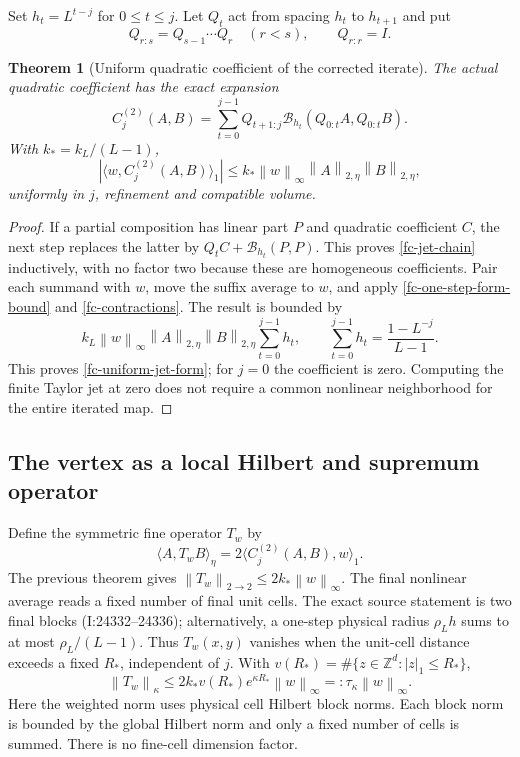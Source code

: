 \documentclass[11pt]{article}
\newtheorem{theorem}{Theorem}
\theoremstyle{remark}\newtheorem{remark}[theorem]{Remark}
\newcommand{\norm}[1]{\left\lVert#1\right\rVert}
\begin{document}
Set $h_t=L^{t-j}$ for $0\le t\le j$. Let $Q_t$ act from spacing
$h_t$ to $h_{t+1}$ and put
\[
 Q_{r:s}=Q_{s-1}\cdots Q_r\quad(r<s),\qquad Q_{r:r}=I.
\]

\begin{theorem}[Uniform quadratic coefficient of the corrected iterate]
\label{fc-iterated-jet-theorem}
The actual quadratic coefficient has the exact expansion
\begin{equation}
 C_j^{(2)}(A,B)=\sum_{t=0}^{j-1}Q_{t+1:j}
       \mathcal B_{h_t}(Q_{0:t}A,Q_{0:t}B).
 \label{fc-jet-chain}
\end{equation}
With $k_*=k_L/(L-1)$,
\begin{equation}
 |\langle w,C_j^{(2)}(A,B)\rangle_1|
 \le k_*\norm{w}_\infty\norm{A}_{2,\eta}\norm{B}_{2,\eta},
 \label{fc-uniform-jet-form}
\end{equation}
uniformly in $j$, refinement and compatible volume.
\end{theorem}

\begin{proof}
If a partial composition has linear part $P$ and quadratic
coefficient $C$, the next step replaces the latter by
$Q_tC+\mathcal B_{h_t}(P,P)$. This proves
\eqref{fc-jet-chain} inductively, with no factor two because these
are homogeneous coefficients. Pair each summand with $w$, move
the suffix average to $w$, and apply
\eqref{fc-one-step-form-bound} and \eqref{fc-contractions}.
The result is bounded by
\[
 k_L\norm{w}_\infty\norm{A}_{2,\eta}\norm{B}_{2,\eta}
       \sum_{t=0}^{j-1}h_t,
 \qquad
 \sum_{t=0}^{j-1}h_t=\frac{1-L^{-j}}{L-1}.
\]
This proves \eqref{fc-uniform-jet-form}; for $j=0$ the coefficient
is zero. Computing the finite Taylor jet at zero does not require
a common nonlinear neighborhood for the entire iterated map.
\end{proof}

\subsection{The vertex as a local Hilbert and supremum operator}
\label{fc-vertex-norm-section}

Define the symmetric fine operator $T_w$ by
\begin{equation}
 \langle A,T_wB\rangle_\eta
       =2\langle C_j^{(2)}(A,B),w\rangle_1.
 \label{fc-T-definition}
\end{equation}
The previous theorem gives
$\norm{T_w}_{2\to2}\le2k_*\norm{w}_\infty$.
The final nonlinear average reads a fixed number of final unit
cells. The exact source statement is two final blocks
(I:24332--24336); alternatively, a one-step physical radius
$\rho_Lh$ sums to at most $\rho_L/(L-1)$. Thus $T_w(x,y)$ vanishes
when the unit-cell distance exceeds a fixed $R_*$, independent of
$j$. With $v(R_*)=\#\{z\in\mathbb Z^d:|z|_1\le R_*\}$,
\begin{equation}
 \norm{T_w}_\kappa\le
  2k_*v(R_*)e^{\kappa R_*}\norm{w}_\infty
  =:\tau_\kappa\norm{w}_\infty.
 \label{fc-T-weighted}
\end{equation}
Here the weighted norm uses physical cell Hilbert block norms.
Each block norm is bounded by the global Hilbert norm and only a
fixed number of cells is summed. There is no fine-cell dimension
factor.
\end{document}
